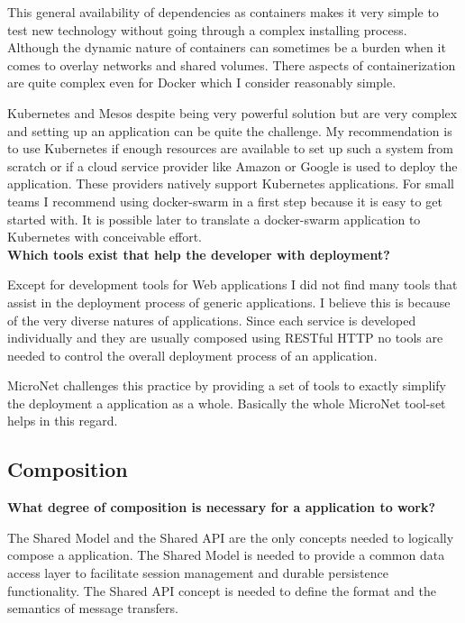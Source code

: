 This general availability of dependencies as containers makes it very simple to
test new technology without going through a complex installing process. Although
the dynamic nature of containers can sometimes be a burden when it comes to
overlay networks and shared volumes. There aspects of containerization are quite complex
even for Docker which I consider reasonably simple.

Kubernetes and Mesos despite being very powerful solution but are very complex
and setting up an application can be quite the challenge. My recommendation is
to use Kubernetes if enough resources are available to set up such a system from
scratch or if a cloud service provider like Amazon or Google is used to deploy
the application. These providers natively support Kubernetes applications. For
small teams I recommend using docker-swarm in a first step because it is easy
to get started with. It is possible later to translate a docker-swarm
application to Kubernetes with	conceivable effort.\\

\noindent
\textbf{Which tools exist that help the developer with deployment?}

Except for development tools for Web applications I did not find many tools that
assist in the deployment process of generic \ms{} applications. I believe this
is because of the very diverse natures of \ms{} applications. Since each service
is developed individually and they are usually composed using RESTful HTTP no
tools are needed to control the overall deployment process of an application.

MicroNet challenges this practice by providing a set of tools to exactly
simplify the deployment a \ms{} application as a whole. Basically the whole
MicroNet tool-set helps in this regard.

\subsection{\ms{} Composition}

\noindent
\textbf{What degree of composition is necessary for a \ms{} application
to work?}

The Shared Model and the Shared API are the only concepts needed to logically
compose a \ms{} application. The Shared Model is needed to provide a common data
access layer to facilitate session management and durable persistence
functionality. The Shared API concept is needed to define the format and the
semantics of message transfers.

